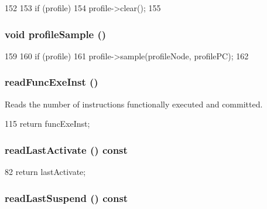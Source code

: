 \begin{DoxyCode}
152 {
153     if (profile)
154         profile->clear();
155 }
\end{DoxyCode}
\hypertarget{structThreadState_aba547b904bdcf83196f983f79d285caf}{
\subsubsection[{profileSample}]{\setlength{\rightskip}{0pt plus 5cm}void profileSample ()}}
\label{structThreadState_aba547b904bdcf83196f983f79d285caf}



\begin{DoxyCode}
159 {
160     if (profile)
161         profile->sample(profileNode, profilePC);
162 }
\end{DoxyCode}
\hypertarget{structThreadState_a2b0bef6e1b1ac24e9322fbd09a511d11}{
\subsubsection[{readFuncExeInst}]{ readFuncExeInst ()}}
\label{structThreadState_a2b0bef6e1b1ac24e9322fbd09a511d11}
Reads the number of instructions functionally executed and committed. 


\begin{DoxyCode}
115 { return funcExeInst; }
\end{DoxyCode}
\hypertarget{structThreadState_a78096bf01bfdffc7e26ebcfbffbd84f8}{
\subsubsection[{readLastActivate}]{ readLastActivate () const}}
\label{structThreadState_a78096bf01bfdffc7e26ebcfbffbd84f8}



\begin{DoxyCode}
82 { return lastActivate; }
\end{DoxyCode}
\hypertarget{structThreadState_a7e2c7c6c7f94c03061a1916044e36880}{
\subsubsection[{readLastSuspend}]{ readLastSuspend () const}}
\label{structThreadState_a7e2c7c6c7f94c03061a1916044e36880}



